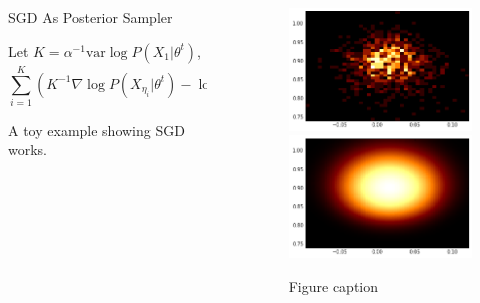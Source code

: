 \documentclass[final]{beamer}
\newlength{\sepwid}
\newlength{\onecolwid}
\newcommand{\N}{\mathscr{N}}
\newcommand{\var}{\mathrm{var}}
\begin{document}
\begin{frame}[t]
\begin{columns}[t]
\begin{column}{\onecolwid}

\begin{block}{SGD As Posterior Sampler}

\begin{theorem}
Let $K = \alpha^{-1} \var \log P(X_1|\theta^t)$,
\[
\sum_{i=1}^K (K^{-1}\nabla \log P(X_{\eta_i}|\theta^t) - \log P(\theta^t)) - (n^{-1} \sum_{i=1}^n \nabla \log P(X_i|\theta^t) - \log P(\theta^t)) \sim \N(0, \alpha).
\]
\end{theorem}

A toy example showing SGD works.

\end{block}


\end{column} %

\begin{column}{\sepwid}\end{column} %

\begin{column}{\onecolwid} %



\begin{figure}
\includegraphics[width=0.5\linewidth]{../figure/simulation2_empirical.png}
\includegraphics[width=0.5\linewidth]{../figure/simulation2_real.png}
\caption{Figure caption}
\end{figure}



\end{column}
\end{columns}
\end{frame}
\end{document}
